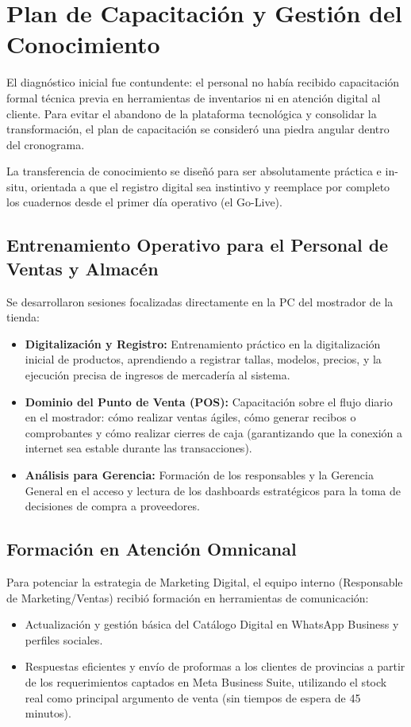 \section{Plan de Capacitación y Gestión del Conocimiento}

El diagnóstico inicial fue contundente: el personal no había recibido capacitación formal técnica previa en herramientas de inventarios ni en atención digital al cliente. Para evitar el abandono de la plataforma tecnológica y consolidar la transformación, el plan de capacitación se consideró una piedra angular dentro del cronograma. 

La transferencia de conocimiento se diseñó para ser absolutamente práctica e in-situ, orientada a que el registro digital sea instintivo y reemplace por completo los cuadernos desde el primer día operativo (el Go-Live).

\subsection{Entrenamiento Operativo para el Personal de Ventas y Almacén}
Se desarrollaron sesiones focalizadas directamente en la PC del mostrador de la tienda:
\begin{itemize}
    \item \textbf{Digitalización y Registro:} Entrenamiento práctico en la digitalización inicial de productos, aprendiendo a registrar tallas, modelos, precios, y la ejecución precisa de ingresos de mercadería al sistema.
    \item \textbf{Dominio del Punto de Venta (POS):} Capacitación sobre el flujo diario en el mostrador: cómo realizar ventas ágiles, cómo generar recibos o comprobantes y cómo realizar cierres de caja (garantizando que la conexión a internet sea estable durante las transacciones).
    \item \textbf{Análisis para Gerencia:} Formación de los responsables y la Gerencia General en el acceso y lectura de los dashboards estratégicos para la toma de decisiones de compra a proveedores.
\end{itemize}

\subsection{Formación en Atención Omnicanal}
Para potenciar la estrategia de Marketing Digital, el equipo interno (Responsable de Marketing/Ventas) recibió formación en herramientas de comunicación:
\begin{itemize}
    \item Actualización y gestión básica del Catálogo Digital en WhatsApp Business y perfiles sociales.
    \item Respuestas eficientes y envío de proformas a los clientes de provincias a partir de los requerimientos captados en Meta Business Suite, utilizando el stock real como principal argumento de venta (sin tiempos de espera de 45 minutos).
\end{itemize}

